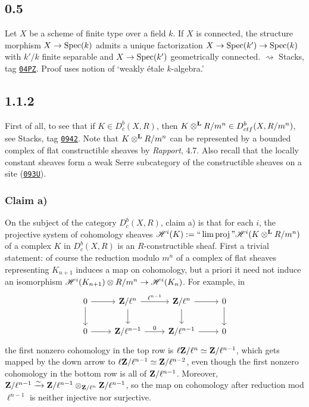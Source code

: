 \documentclass[deligne.tex]{subfiles}
\begin{document}
\subsection*{0.5}
Let $X$ be a scheme of finite type over a field $k$.
If $X$ is connected, the structure morphism $X\rightarrow\operatorname{Spec}(k)$ admits a
unique factorization $X\rightarrow\operatorname{Spec}(k')\rightarrow\operatorname{Spec}(k)$ with
$k'/k$ finite separable and $X\rightarrow\operatorname{Spec}(k')$ geometrically connected.
{\Large $\rightsquigarrow$} Stacks, tag \texttt{\href{https://stacks.math.columbia.edu/tag/04PZ}{04PZ}}.
Proof uses notion of `weakly étale $k$-algebra.'


\subsection*{1.1.2}\label{WeilII_1.1.2}
First of all, to see that if $K\in D_c^b(X,R)$, then
$K\otimes^{\mathbf{L}} R/m^n\in D_{ctf}^b(X,R/m^n)$, see Stacks, tag
\texttt{\href{https://stacks.math.columbia.edu/tag/0942}{0942}}.
Note that $K\otimes^{\mathbf{L}} R/m^n$ can be represented by a bounded complex of flat
constructible sheaves by \textit{Rapport}, 4.7.
Also recall that the locally constant sheaves form a weak Serre subcategory
of the constructible sheaves on a site (\texttt{\href{https://stacks.math.columbia.edu/tag/093U}{093U}}).

\subsubsection*{Claim a)}
On the subject of the category $D_c^b(X,R)$, claim a) is that for each $i$,
the projective system of cohomology sheaves
$\mathscr H^i(K):=``\lim\operatorname{proj}"\mathscr H^i(K\otimes^{\mathbf{L}} R/m^n)$ of a complex
$K$ in $D_c^b(X,R)$ is an $R$-constructible sheaf.
First a trivial statement: of course the reduction modulo $m^n$ of a
complex of flat sheaves representing $K_{n+1}$ induces
a map on cohomology, but a priori it need not induce an isomorphism
$\mathscr H^i(K_{n+1})\otimes R/m^n\rightarrow\mathscr H^i(K_n)$.
For example, in
\begin{equation*}
\begin{tikzcd}
	0\arrow[r]\arrow[d]&\ZZ/\ell^n\arrow[r,"\ell^{n-1}"]\arrow[d]
	&\ZZ/\ell^n\arrow[d]\arrow[r]&0\arrow[d] \\
	0\arrow[r]&\ZZ/\ell^{n-1}\arrow[r,"0"]&\ZZ/\ell^{n-1}\arrow[r]&0
\end{tikzcd}
\end{equation*}
the first nonzero cohomology in the top row is
$\ell\mathbf{Z}/\ell^n\simeq\mathbf{Z}/\ell^{n-1}$, which gets mapped by the down arrow
to $\ell\mathbf{Z}/\ell^{n-1}\simeq\mathbf{Z}/\ell^{n-2}$, even though the first nonzero
cohomology in the bottom row is all of $\mathbf{Z}/\ell^{n-1}$. Moreover,
$\mathbf{Z}/\ell^{n-1}\xrightarrow\sim\mathbf{Z}/\ell^{n-1}\otimes_{\mathbf{Z}/\ell^n}\mathbf{Z}/\ell^{n-1}$,
so the map on cohomology after reduction mod $\ell^{n-1}$ is neither
injective nor surjective.
\end{document}

